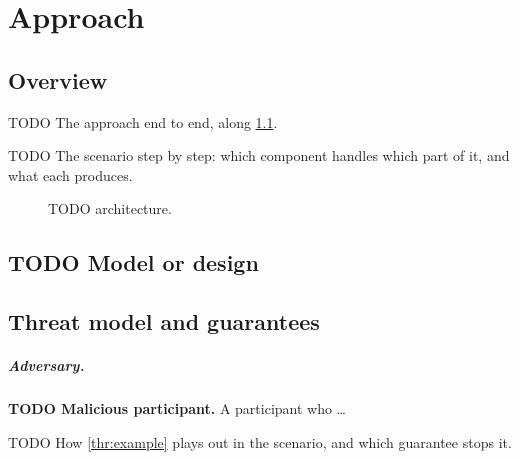 \chapter{Approach}\label{ch:approach}

\section{Overview}
TODO The approach end to end, along \cref{guide:fig:architecture}.
\begin{runningexample}
TODO The scenario step by step: which component handles which part of it, and what each produces.
\end{runningexample}

\begin{figure}[!ht]
  \centering
  \caption{TODO architecture.}
  \label{guide:fig:architecture}
\end{figure}

\section{TODO Model or design}

\section{Threat model and guarantees}

\paragraph{Adversary.}
\begin{threats}
  \item\label{thr:example} \textbf{TODO Malicious participant.} A participant who \dots
\end{threats}

\begin{runningexample}
TODO How \cref{thr:example} plays out in the scenario, and which guarantee stops it.
\end{runningexample}

